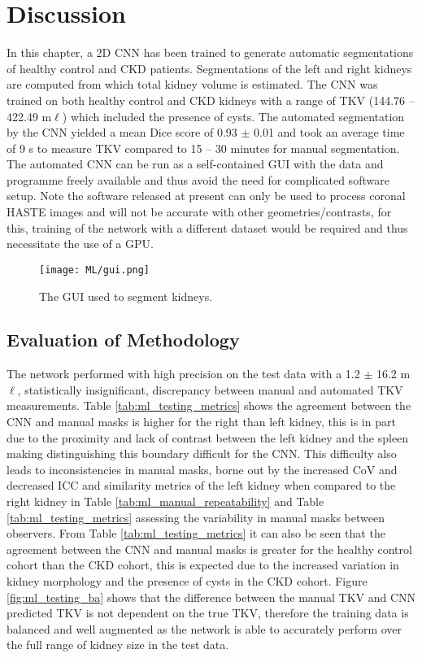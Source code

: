 \newpage

\section{Discussion}
In this chapter, a 2D \ac{CNN} has been trained to generate automatic segmentations of healthy control and \ac{CKD} patients. Segmentations of the left and right kidneys are computed from which total kidney volume is estimated. The \ac{CNN} was trained on both healthy control and \ac{CKD} kidneys with a range of \ac{TKV} (144.76 – 422.49 m$\ell$) which included the presence of cysts. The automated segmentation by the \ac{CNN} yielded a mean Dice score of 0.93 $\pm$ 0.01 and took an average time of 9 s to measure \ac{TKV} compared to 15 – 30 minutes \cite{zollner_assessment_2012} for manual segmentation. The automated \ac{CNN} can be run as a self-contained \ac{GUI} with the data and programme freely available \cite{daniel_alexdaniel654/renal_segmentor_2020} and thus avoid the need for complicated software setup. Note the software released at present can only be used to process coronal HASTE images and will not be accurate with other geometries/contrasts, for this, training of the network with a different dataset would be required and thus necessitate the use of a \ac{GPU}.

\begin{figure}[H]
	\centering
	\texttt{[image: ML/gui.png]}
	\caption{The \acl{GUI} used to segment kidneys.}
	\label{fig:ml_gui}	
\end{figure}

\newpage
\subsection{Evaluation of Methodology}

The network performed with high precision on the test data with a 1.2 $\pm$ 16.2 m$\ell$, statistically insignificant, discrepancy between manual and automated \ac{TKV} measurements. Table \ref{tab:ml_testing_metrics} shows the agreement between the \ac{CNN} and manual masks is higher for the right than left kidney, this is in part due to the proximity and lack of contrast between the left kidney and the spleen making distinguishing this boundary difficult for the \ac{CNN}. This difficulty also leads to inconsistencies in manual masks, borne out by the increased \ac{CoV} and decreased \ac{ICC} and similarity metrics of the left kidney when compared to the right kidney in Table \ref{tab:ml_manual_repeatability} and Table \ref{tab:ml_testing_metrics} assessing the variability in manual masks between observers. From Table \ref{tab:ml_testing_metrics} it can also be seen that the agreement between the \ac{CNN} and manual masks is greater for the healthy control cohort than the \ac{CKD} cohort, this is expected due to the increased variation in kidney morphology and the presence of cysts in the \ac{CKD} cohort. Figure \ref{fig:ml_testing_ba} shows that the difference between the manual \ac{TKV} and \ac{CNN} predicted \ac{TKV} is not dependent on the true \ac{TKV}, therefore the training data is balanced and well augmented as the network is able to accurately perform over the full range of kidney size in the test data. 

